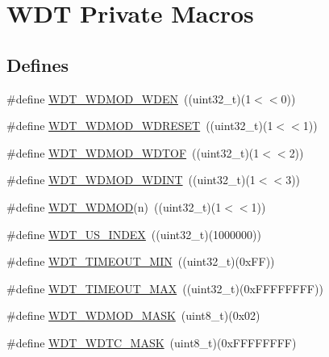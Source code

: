 \hypertarget{group___w_d_t___private___macros}{\section{\-W\-D\-T \-Private \-Macros}
\label{group___w_d_t___private___macros}
}
\subsection*{\-Defines}
\begin{DoxyCompactItemize}
\item 
\#define \hyperlink{group___w_d_t___private___macros_ga13c0108b9b798faa761d131a7caedaa6}{\-W\-D\-T\-\_\-\-W\-D\-M\-O\-D\-\_\-\-W\-D\-E\-N}~((uint32\-\_\-t)(1$<$$<$0))
\item 
\#define \hyperlink{group___w_d_t___private___macros_gaa24f93ca2d8ce2eaaa55c8973a8a5453}{\-W\-D\-T\-\_\-\-W\-D\-M\-O\-D\-\_\-\-W\-D\-R\-E\-S\-E\-T}~((uint32\-\_\-t)(1$<$$<$1))
\item 
\#define \hyperlink{group___w_d_t___private___macros_ga5e9c3c0c485b694053bdd3e43d5a9730}{\-W\-D\-T\-\_\-\-W\-D\-M\-O\-D\-\_\-\-W\-D\-T\-O\-F}~((uint32\-\_\-t)(1$<$$<$2))
\item 
\#define \hyperlink{group___w_d_t___private___macros_gaa557a08bfcbbb1652f38b9433060ef61}{\-W\-D\-T\-\_\-\-W\-D\-M\-O\-D\-\_\-\-W\-D\-I\-N\-T}~((uint32\-\_\-t)(1$<$$<$3))
\item 
\#define \hyperlink{group___w_d_t___private___macros_ga6661370a2f08e062f9d9a9fffd9cc932}{\-W\-D\-T\-\_\-\-W\-D\-M\-O\-D}(n)~((uint32\-\_\-t)(1$<$$<$1))
\item 
\#define \hyperlink{group___w_d_t___private___macros_ga6e4021c206fe752fabf43f4ec19a0b5c}{\-W\-D\-T\-\_\-\-U\-S\-\_\-\-I\-N\-D\-E\-X}~((uint32\-\_\-t)(1000000))
\item 
\#define \hyperlink{group___w_d_t___private___macros_gaef7a6f7ad8a863abf1b818ba2f1317ae}{\-W\-D\-T\-\_\-\-T\-I\-M\-E\-O\-U\-T\-\_\-\-M\-I\-N}~((uint32\-\_\-t)(0x\-F\-F))
\item 
\#define \hyperlink{group___w_d_t___private___macros_ga27814f22a9ac61d98ea9d22309b7b9ee}{\-W\-D\-T\-\_\-\-T\-I\-M\-E\-O\-U\-T\-\_\-\-M\-A\-X}~((uint32\-\_\-t)(0x\-F\-F\-F\-F\-F\-F\-F\-F))
\item 
\#define \hyperlink{group___w_d_t___private___macros_gadcdea26c2654bda3331ce1edb5d93b12}{\-W\-D\-T\-\_\-\-W\-D\-M\-O\-D\-\_\-\-M\-A\-S\-K}~(uint8\-\_\-t)(0x02)
\item 
\#define \hyperlink{group___w_d_t___private___macros_ga7079274d8f548b3acc309a483c5c374e}{\-W\-D\-T\-\_\-\-W\-D\-T\-C\-\_\-\-M\-A\-S\-K}~(uint8\-\_\-t)(0x\-F\-F\-F\-F\-F\-F\-F\-F)
$$
\end{DoxyCompactItemize}
